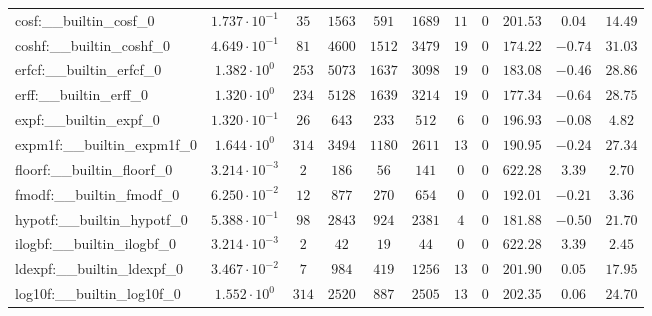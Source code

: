 \begin{tabular}{|l|c|c|c|c|c|c|c|c|c|c|}
cosf:\_\_builtin\_cosf\_0                 & $ 1.737 \cdot 10^{-1} $ & $ 35     $ & $ 1563  $ & $ 591   $ & $ 1689  $ & $ 11  $ & $ 0 $ & $ 201.53      $ & $ 0.04    $ & $ 14.49   $ \\
coshf:\_\_builtin\_coshf\_0               & $ 4.649 \cdot 10^{-1} $ & $ 81     $ & $ 4600  $ & $ 1512  $ & $ 3479  $ & $ 19  $ & $ 0 $ & $ 174.22      $ & $ -0.74   $ & $ 31.03   $ \\
erfcf:\_\_builtin\_erfcf\_0               & $ 1.382 \cdot 10^{0}  $ & $ 253    $ & $ 5073  $ & $ 1637  $ & $ 3098  $ & $ 19  $ & $ 0 $ & $ 183.08      $ & $ -0.46   $ & $ 28.86   $ \\
erff:\_\_builtin\_erff\_0                 & $ 1.320 \cdot 10^{0}  $ & $ 234    $ & $ 5128  $ & $ 1639  $ & $ 3214  $ & $ 19  $ & $ 0 $ & $ 177.34      $ & $ -0.64   $ & $ 28.75   $ \\
expf:\_\_builtin\_expf\_0                 & $ 1.320 \cdot 10^{-1} $ & $ 26     $ & $ 643   $ & $ 233   $ & $ 512   $ & $ 6   $ & $ 0 $ & $ 196.93      $ & $ -0.08   $ & $ 4.82    $ \\
expm1f:\_\_builtin\_expm1f\_0             & $ 1.644 \cdot 10^{0}  $ & $ 314    $ & $ 3494  $ & $ 1180  $ & $ 2611  $ & $ 13  $ & $ 0 $ & $ 190.95      $ & $ -0.24   $ & $ 27.34   $ \\
floorf:\_\_builtin\_floorf\_0             & $ 3.214 \cdot 10^{-3} $ & $ 2      $ & $ 186   $ & $ 56    $ & $ 141   $ & $ 0   $ & $ 0 $ & $ 622.28      $ & $ 3.39    $ & $ 2.70    $ \\
fmodf:\_\_builtin\_fmodf\_0               & $ 6.250 \cdot 10^{-2} $ & $ 12     $ & $ 877   $ & $ 270   $ & $ 654   $ & $ 0   $ & $ 0 $ & $ 192.01      $ & $ -0.21   $ & $ 3.36    $ \\
hypotf:\_\_builtin\_hypotf\_0             & $ 5.388 \cdot 10^{-1} $ & $ 98     $ & $ 2843  $ & $ 924   $ & $ 2381  $ & $ 4   $ & $ 0 $ & $ 181.88      $ & $ -0.50   $ & $ 21.70   $ \\
ilogbf:\_\_builtin\_ilogbf\_0             & $ 3.214 \cdot 10^{-3} $ & $ 2      $ & $ 42    $ & $ 19    $ & $ 44    $ & $ 0   $ & $ 0 $ & $ 622.28      $ & $ 3.39    $ & $ 2.45    $ \\
ldexpf:\_\_builtin\_ldexpf\_0             & $ 3.467 \cdot 10^{-2} $ & $ 7      $ & $ 984   $ & $ 419   $ & $ 1256  $ & $ 13  $ & $ 0 $ & $ 201.90      $ & $ 0.05    $ & $ 17.95   $ \\
log10f:\_\_builtin\_log10f\_0             & $ 1.552 \cdot 10^{0}  $ & $ 314    $ & $ 2520  $ & $ 887   $ & $ 2505  $ & $ 13  $ & $ 0 $ & $ 202.35      $ & $ 0.06    $ & $ 24.70   $ \\

\end{tabular}

